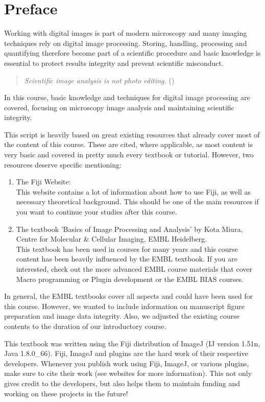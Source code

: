\chapter*{Preface}

Working with digital images is part of modern microscopy and many imaging techniques rely on digital image processing. Storing, handling, processing and quantifying therefore become part of a scientific procedure and basic knowledge is essential to protect results integrity and prevent scientific misconduct. 

\begin{quote}
	\emph{Scientific image analysis is not photo editing.} (\cite{rossner2004})
\end{quote}

In this course, basic knowledge and techniques for digital image processing are covered, focusing on microscopy image analysis and maintaining scientific integrity. 


This script is heavily based on great existing resources that already cover most of the content of this course. These are cited, where applicable, as most content is very basic and covered in pretty much every textbook or tutorial. However, two resources deserve specific mentioning:
\begin{enumerate}
	\item The Fiji Website:\\This website contains a lot of information about how to use Fiji, as well as necessary theoretical background. This should be one of the main resources if you want to continue your studies after this course.
	\item The textbook 'Basics of Image Processing and Analysis' by Kota Miura, Centre for Molecular \& Cellular Imaging, EMBL Heidelberg.\\This textbook has been used in courses for many years and this course content has been heavily influenced by the EMBL textbook. If you are interested, check out the more advanced EMBL course materials that cover Macro programming or Plugin development or the EMBL BIAS courses.
\end{enumerate}

In general, the EMBL textbooks cover all aspects and could have been used for this course. However, we wanted to include information on manuscript figure preparation and image data integrity. Also, we adjusted the existing course contents to the duration of our introductory course.

This textbook was written using the Fiji distribution of ImageJ (IJ version 1.51n, Java 1.8.0\_66). Fiji, ImageJ and plugins are the hard work of their respective developers. Whenever you publish work using Fiji, ImageJ, or various plugins, make sure to cite their work (see websites for more information). This not only gives credit to the developers, but also helps them to maintain funding and working on these projects in the future!
